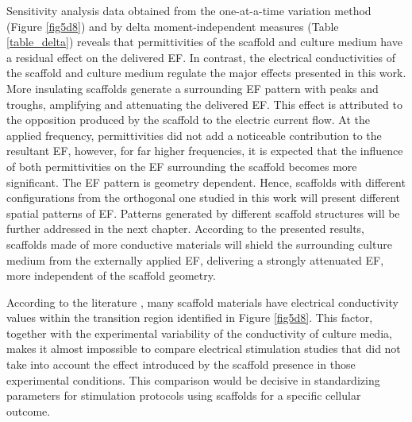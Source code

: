 Sensitivity analysis data obtained from the one-at-a-time variation method (Figure \ref{fig5d8}) and by delta moment-independent measures (Table \ref{table_delta}) reveals that permittivities of the scaffold and culture medium have a residual effect on the delivered \acs{EF}. In contrast, the electrical conductivities of the scaffold and culture medium regulate the major effects presented in this work. More insulating scaffolds generate a surrounding \acs{EF} pattern with peaks and troughs, amplifying and attenuating the delivered \acs{EF}. This effect is attributed to the opposition produced by the scaffold to the electric current flow. At the applied frequency, permittivities did not add a noticeable contribution to the resultant \acs{EF}, however, for far higher frequencies, it is expected that the influence of both permittivities on the \acs{EF} surrounding the scaffold becomes more significant. The \acs{EF} pattern is geometry dependent. Hence, scaffolds with different configurations from the orthogonal one studied in this work will present different spatial patterns of \acs{EF}. Patterns generated by different scaffold structures will be further addressed in the next chapter. According to the presented results, scaffolds made of more conductive materials will shield the surrounding culture medium from the externally applied \acs{EF}, delivering a strongly attenuated \acs{EF}, more independent of the scaffold geometry.

According to the literature \cite{Distler2020-gi, Balint2014-ti}, many scaffold materials have electrical conductivity values within the transition region identified in Figure \ref{fig5d8}. This factor, together with the experimental variability of the conductivity of culture media, makes it almost impossible to compare electrical stimulation studies that did not take into account the effect introduced by the scaffold presence in those experimental conditions. This comparison would be decisive in standardizing parameters for stimulation protocols using scaffolds for a specific cellular outcome. 

